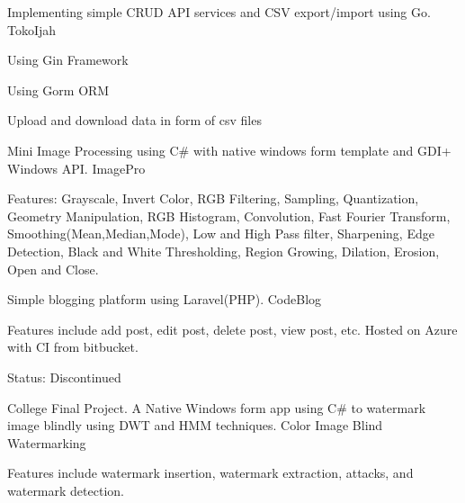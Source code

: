 \begin{cventries}
\cventry
    {Implementing simple CRUD API services and CSV export/import using Go.}
    {TokoIjah}
    {\href{https://github.com/mfathirirhas/TokoIjah}{\faGithubSquare\acvHeaderIconSep\@Source}}
    {}
    {
        \begin{cvitems}
            \item {Using Gin Framework}
            \item {Using Gorm ORM}
            \item {Upload and download data in form of csv files}
        \end{cvitems}
    }

    
\cventry
    {Mini Image Processing using C\# with native windows form template and GDI+ Windows API.}
    {ImagePro}
    {\href{https://github.com/mfathirirhas/ImagePro}{\faGithubSquare\acvHeaderIconSep\@Source}}
    {}
    {
        \begin{cvitems}
            \item {Features: Grayscale, Invert Color, RGB Filtering, Sampling, Quantization, Geometry Manipulation, RGB Histogram, Convolution, Fast Fourier Transform, Smoothing(Mean,Median,Mode), Low and High Pass filter, Sharpening, Edge Detection, Black and White Thresholding, Region Growing, Dilation, Erosion, Open and Close.}
        \end{cvitems}
    }


\cventry
    {Simple blogging platform using Laravel(PHP).}
    {CodeBlog}
    {\href{https://github.com/mfathirirhas/codeblog}{\faGithubSquare\acvHeaderIconSep\@Source}}
    {}
    {
        \begin{cvitems}
            \item {Features include add post, edit post, delete post, view post, etc. Hosted on Azure with CI from bitbucket.}
            \item {Status: Discontinued}
        \end{cvitems}
    }


\cventry
    {College Final Project. A Native Windows form app using C\# to watermark image blindly using DWT and HMM techniques.}
    {Color Image Blind Watermarking}
    {\href{https://github.com/mfathirirhas/TugasAkhir1}{\faGithubSquare\acvHeaderIconSep\@Source}}
    {}
    {
        \begin{cvitems}
            \item {Features include watermark insertion, watermark extraction, attacks, and watermark detection.}
        \end{cvitems}
    }



\end{cventries}
